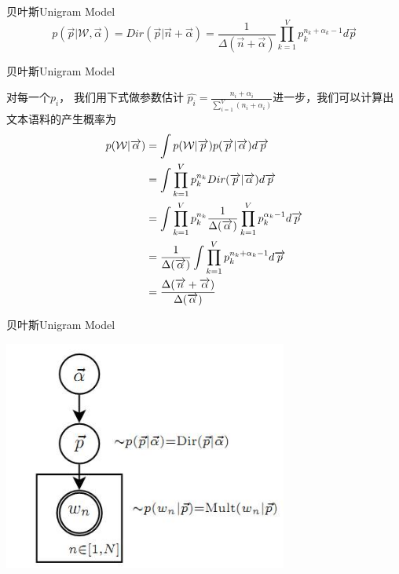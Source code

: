 \documentclass{beamer}
\begin{document}
\begin{CJK*}{UTF8}{gbsn}
\begin{frame}{贝叶斯Unigram Model}
\[
p(\overrightarrow{p}|\mathcal{W},\overrightarrow{\alpha})
= Dir(\overrightarrow{p}|\overrightarrow{n}+ \overrightarrow{\alpha})
= \frac{1}{\Delta(\overrightarrow{n}+\overrightarrow{\alpha})}
\prod_{k=1}^V p_k^{n_k + \alpha_k -1} d\overrightarrow{p}
\]
\end{frame}


\begin{frame}{贝叶斯Unigram Model}
\begin{small}

对每一个$p_i$， 我们用下式做参数估计
$
\hat{p_i} = \frac{n_i + \alpha_i}{\sum_{i=1}^V(n_i + \alpha_i)}
$进一步，我们可以计算出文本语料的产生概率为
\begin{align}
p(\mathcal{W}|\overrightarrow{\alpha}) & = \int p(\mathcal{W}|\overrightarrow{p}) p(\overrightarrow{p}|\overrightarrow{\alpha})d\overrightarrow{p} \notag \\
& = \int \prod_{k=1}^V p_k^{n_k} Dir(\overrightarrow{p}|\overrightarrow{\alpha}) d\overrightarrow{p} \notag \\
& = \int \prod_{k=1}^V p_k^{n_k} \frac{1}{\Delta(\overrightarrow{\alpha})}
\prod_{k=1}^V p_k^{\alpha_k -1} d\overrightarrow{p} \notag \\
&= \frac{1}{\Delta(\overrightarrow{\alpha})}
\int \prod_{k=1}^V p_k^{n_k + \alpha_k -1} d\overrightarrow{p} \notag \\
& = \frac{\Delta(\overrightarrow{n}+\overrightarrow{\alpha})}{\Delta(\overrightarrow{\alpha})}
\label{likelihood-dir-mult}
\end{align}

\end{small}
\end{frame}



\begin{frame}{贝叶斯Unigram Model}
\begin{center}
      \includegraphics[width=0.7\textwidth]{picture/doc1.jpeg}
\end{center}
\end{frame}

\end{CJK*}
\end{document}

